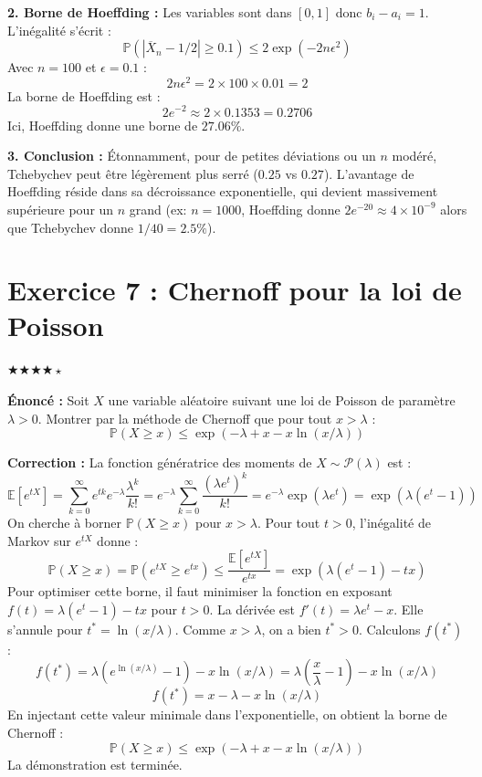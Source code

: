 \documentclass[11pt,a4paper]{article}
\begin{document}
\textbf{2. Borne de Hoeffding :}
Les variables sont dans $[0, 1]$ donc $b_i - a_i = 1$. L'inégalité s'écrit :
$$ \mathbb{P}(|\overline{X}_n - 1/2| \ge 0.1) \le 2 \exp(-2 n \epsilon^2) $$
Avec $n = 100$ et $\epsilon = 0.1$ :
$$ 2 n \epsilon^2 = 2 \times 100 \times 0.01 = 2 $$
La borne de Hoeffding est :
$$ 2 e^{-2} \approx 2 \times 0.1353 = 0.2706 $$
Ici, Hoeffding donne une borne de $27.06\%$.

\textbf{3. Conclusion :}
Étonnamment, pour de petites déviations ou un $n$ modéré, Tchebychev peut être légèrement plus serré ($0.25$ vs $0.27$). L'avantage de Hoeffding réside dans sa décroissance exponentielle, qui devient massivement supérieure pour un $n$ grand (ex: $n=1000$, Hoeffding donne $2e^{-20} \approx 4 \times 10^{-9}$ alors que Tchebychev donne $1/40 = 2.5\%$).


\section*{Exercice 7 : Chernoff pour la loi de Poisson}

$\bigstar\bigstar\bigstar\bigstar\star$

\textbf{Énoncé :}
Soit $X$ une variable aléatoire suivant une loi de Poisson de paramètre $\lambda > 0$.
Montrer par la méthode de Chernoff que pour tout $x > \lambda$ :
$$ \mathbb{P}(X \ge x) \le \exp(-\lambda + x - x \ln(x/\lambda)) $$

\textbf{Correction :}
La fonction génératrice des moments de $X \sim \mathcal{P}(\lambda)$ est :
$$ \mathbb{E}[e^{tX}] = \sum_{k=0}^\infty e^{tk} e^{-\lambda} \frac{\lambda^k}{k!} = e^{-\lambda} \sum_{k=0}^\infty \frac{(\lambda e^t)^k}{k!} = e^{-\lambda} \exp(\lambda e^t) = \exp(\lambda(e^t - 1)) $$
On cherche à borner $\mathbb{P}(X \ge x)$ pour $x > \lambda$.
Pour tout $t > 0$, l'inégalité de Markov sur $e^{tX}$ donne :
$$ \mathbb{P}(X \ge x) = \mathbb{P}(e^{tX} \ge e^{tx}) \le \frac{\mathbb{E}[e^{tX}]}{e^{tx}} = \exp(\lambda(e^t - 1) - tx) $$
Pour optimiser cette borne, il faut minimiser la fonction en exposant $f(t) = \lambda(e^t - 1) - tx$ pour $t > 0$.
La dérivée est $f'(t) = \lambda e^t - x$.
Elle s'annule pour $t^* = \ln(x/\lambda)$. Comme $x > \lambda$, on a bien $t^* > 0$.
Calculons $f(t^*)$ :
$$ f(t^*) = \lambda\left(e^{\ln(x/\lambda)} - 1\right) - x \ln(x/\lambda) = \lambda\left(\frac{x}{\lambda} - 1\right) - x \ln(x/\lambda) $$
$$ f(t^*) = x - \lambda - x \ln(x/\lambda) $$
En injectant cette valeur minimale dans l'exponentielle, on obtient la borne de Chernoff :
$$ \mathbb{P}(X \ge x) \le \exp(-\lambda + x - x \ln(x/\lambda)) $$
La démonstration est terminée.
\end{document}
